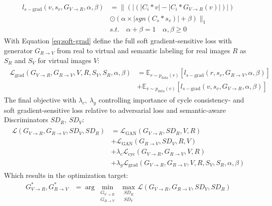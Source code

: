 \begin{align}
	\begin{split}
		l_{s-\text{grad}}(v, s_v, G_{V\rightarrow R}, \alpha, \beta) &= \lVert(|(|C_i*v|-|C_i*G_{V\rightarrow R}(v)|)|)\\
		&\odot (\alpha \times |sgn(C_s*s_v)|+\beta)\rVert_1\\
		&s.t. \quad \alpha + \beta = 1 \quad \alpha, \beta \geq 0
	\end{split} 
	\label{eq:soft-grad}
\end{align}
With Equation \ref{eq:soft-grad} define the full soft gradient-sensitive loss with generator $G_{R\rightarrow V}$ from real to virtual and semantic labeling for real images $R$ as $S_R$ and $S_V$ for virtual images $V$:
\begin{align}
	\begin{split}
		\mathcal{L}_{\text{grad}}(G_{V\rightarrow R}, G_{R\rightarrow V}, V, R, S_V, S_R, \alpha, \beta) &= \mathbb{E}_{r\sim p_{\text{data}}(r)}[l_{s-\text{grad}}(r,s_r, G_{R\rightarrow V}, \alpha, \beta)]\\
		&+ \mathbb{E}_{v\sim p_{\text{data}}(v)}[l_{s-\text{grad}}(v,s_v, G_{V\rightarrow R}, \alpha, \beta)]
	\end{split}
\end{align}
The final objective with $\lambda_c, ~ \lambda_g$ controlling importance of cycle consistency- and soft gradient-sensitive loss relative to adversarial loss and semantic-aware Discriminators $SD_R,~SD_V$:
\begin{align}
	\begin{split}
		\mathcal{L}(G_{V\rightarrow R}, G_{R\rightarrow V}, SD_V, SD_R) &= \mathcal{L}_{\text{GAN}}(G_{V\rightarrow R}, SD_R, V, R)\\
		&+ \mathcal{L}_{\text{GAN}}(G_{R\rightarrow V}, SD_V, R, V)\\
		&+ \lambda_c \mathcal{L}_{\text{cyc}}(G_{V\rightarrow R}, G_{R\rightarrow V}, V, R)\\
		&+ \lambda_g \mathcal{L}_{\text{grad}}(G_{V\rightarrow R}, G_{R\rightarrow V}, V, R, S_V, S_R, \alpha, \beta)
	\end{split}
	\label{eq:final_obj_SG-GAN}
\end{align}
Which results in the optimization target:
\begin{align}
	G^*_{V\rightarrow R}, G^*_{R\rightarrow V} &= \arg \underset{\substack{G_{V\rightarrow R}\\ G_{R\rightarrow V}}}{\min}~ \underset{\substack{SD_R\\SD_V}}{\max}\mathcal{L}(G_{V\rightarrow R}, G_{R\rightarrow V}, SD_V, SD_R)
\end{align}

